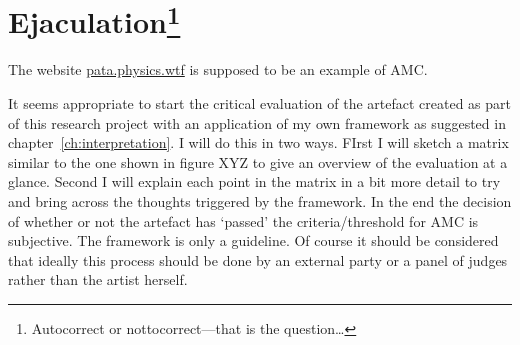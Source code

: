

\section[Ejaculation]{Ejaculation\footnote{Autocorrect or nottocorrect---that is the question\ldots}}


The website \url{pata.physics.wtf} is supposed to be an example of \ac{AMC}.

It seems appropriate to start the critical evaluation of the artefact created as part of this research project with an application of my own framework as suggested in chapter~\ref{ch:interpretation}. I will do this in two ways. FIrst I will sketch a matrix similar to the one shown in figure XYZ to give an overview of the evaluation at a glance. Second I will explain each point in the matrix in a bit more detail to try and bring across the thoughts triggered by the framework. In the end the decision of whether or not the artefact has `passed' the criteria/threshold for \ac{AMC} is subjective. The framework is only a guideline. Of course it should be considered that ideally this process should be done by an external party or a panel of judges rather than the artist herself.


